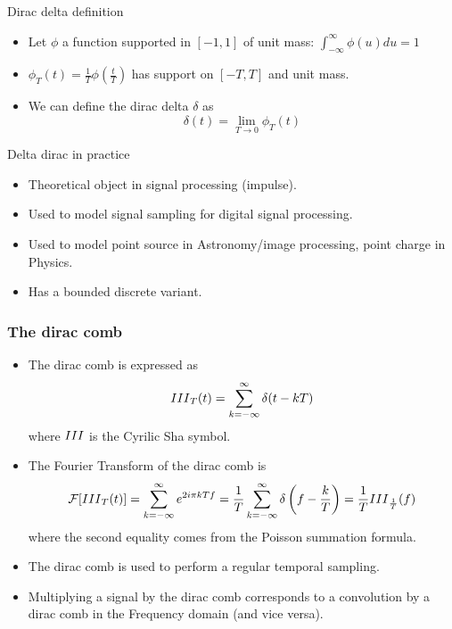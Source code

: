   \begin{block}{ Dirac delta definition}

    \begin{itemize}
      \item Let $\phi$ a function supported in $[-1,1]$ of unit mass: $\int_{-\infty}^\infty \phi(u)du=1$ 
      \item  $\phi_T(t)=\frac{1}{T}\phi(\frac{t}{T})$ has support on $[-T,T]$ and unit mass.
      \item We can define the dirac delta $\delta$ as
      $$ \delta(t)=\lim_{T\rightarrow 0} \phi_T(t) $$


    \end{itemize}
    
    
    \end{block}


    \begin{block}{Delta dirac in practice}
      \begin{itemize}
        \item Theoretical object in signal processing (impulse).
        \item Used to model signal sampling for digital signal processing.
        \item Used to model point source  in Astronomy/image processing, point charge in Physics.
        \item Has a bounded discrete variant.
      \end{itemize}
    \end{block}


\frametitle{The dirac comb}

\begin{itemize}
  \item The dirac comb is expressed as
  \begin{equation}
    {III}_T(t)=\sum_{k=-\infty}^\infty \delta(t-kT)
    \label{eq:dirac_comb}
  \end{equation}
  where ${III}$ is the Cyrilic Sha symbol.
  \item The Fourier Transform of the dirac comb is 
  \begin{equation}
    \mathcal{F}[{III}_T(t)]=\sum_{k=-\infty}^\infty e^{2i\pi k T f}= \frac{1}{T}\sum_{k=-\infty}^\infty \delta\left(f-\frac{k}{T}\right) =  \frac{1}{T}{III}_{\frac{1}{T}}(f)
    \label{eq:ft_dirac_comb}
  \end{equation}
  where the second equality comes from the Poisson summation formula.
  \item The dirac comb is used to perform a regular temporal sampling.
  \item Multiplying a signal by the dirac comb corresponds to a convolution by a dirac comb in the Frequency domain (and vice versa).
\end{itemize}

